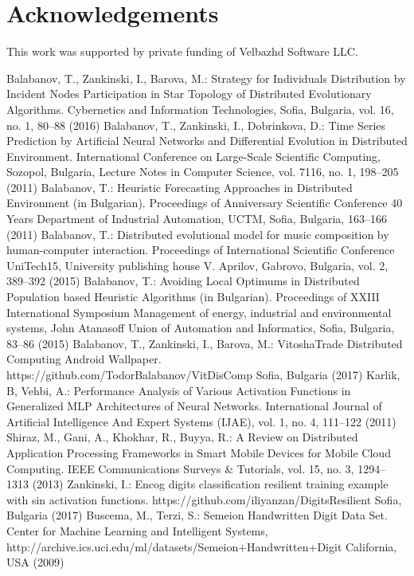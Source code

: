 \documentclass{llncs}
\begin{document}
\section*{Acknowledgements}
%
This work was supported by private funding of Velbazhd Software LLC.
%
%
\begin{thebibliography}{}
%
Balabanov, T., Zankinski, I., Barova, M.:
Strategy for Individuals Distribution by Incident Nodes Participation in Star Topology of Distributed Evolutionary Algorithms.
Cybernetics and Information Technologies, Sofia, Bulgaria, vol. 16, no. 1, 80--88  (2016)
%
Balabanov, T., Zankinski, I., Dobrinkova, D.:
Time Series Prediction by Artificial Neural Networks and Differential Evolution in Distributed Environment.
International Conference on Large-Scale Scientific Computing, Sozopol, Bulgaria, Lecture Notes in Computer Science, vol. 7116, no. 1, 198--205  (2011)
%
Balabanov, T.:
Heuristic Forecasting Approaches in Distributed Environment (in Bulgarian).
Proceedings of Anniversary Scientific Conference 40 Years Department of Industrial Automation, UCTM, Sofia, Bulgaria, 163--166 (2011)
%
Balabanov, T.:
Distributed evolutional model for music composition by human-computer interaction.
Proceedings of International Scientific Conference UniTech15, University publishing house V. Aprilov, Gabrovo, Bulgaria, vol. 2, 389--392 (2015)
%
Balabanov, T.:
Avoiding Local Optimums in Distributed Population based Heuristic Algorithms (in Bulgarian).
Proceedings of XXIII International Symposium Management of energy, industrial and environmental systems, John Atanasoff Union of Automation and Informatics, Sofia, Bulgaria, 83--86 (2015)
%
Balabanov, T., Zankinski, I., Barova, M.:
VitoshaTrade Distributed Computing Android Wallpaper.
https://github.com/TodorBalabanov/VitDisComp Sofia, Bulgaria  (2017)
%
Karlik, B, Vehbi, A.:
Performance Analysis of Various Activation Functions in Generalized MLP Architectures of Neural Networks.
International Journal of Artificial Intelligence And Expert Systems (IJAE), vol. 1, no. 4, 111--122 (2011) 
%
Shiraz, M., Gani, A., Khokhar, R., Buyya, R.:
A Review on Distributed Application Processing Frameworks in Smart Mobile Devices for Mobile Cloud Computing.
IEEE Communications Surveys \& Tutorials, vol. 15, no. 3, 1294--1313 (2013) 
%
Zankinski, I.:
Encog digits classification resilient training example with sin activation functions.
https://github.com/iliyanzan/DigitsResilient Sofia, Bulgaria  (2017)
%
Buscema, M., Terzi, S.:
Semeion Handwritten Digit Data Set.
Center for Machine Learning and Intelligent Systems, http://archive.ics.uci.edu/ml/datasets/Semeion+Handwritten+Digit California, USA  (2009)
%
\end{thebibliography}
\end{document}
